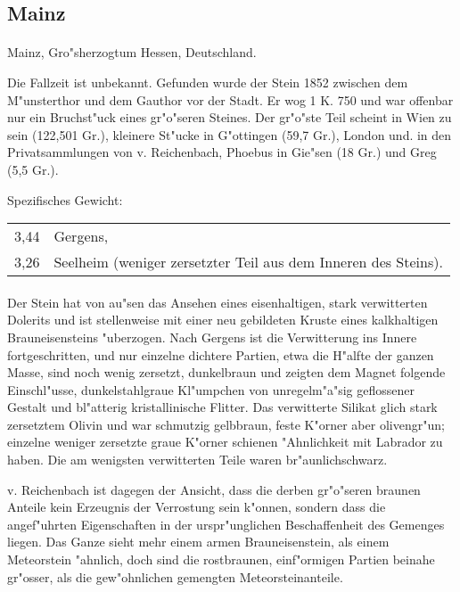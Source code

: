 \documentclass[a4paper, 11pt, oneside]{article}
\begin{document}
\subsection{Mainz}
\normalsize
\paragraph{}
Mainz, Gro"sherzogtum Hessen, Deutschland.

Die Fallzeit ist unbekannt. Gefunden wurde der Stein 1852 zwischen dem M"unsterthor und dem Gauthor vor der Stadt. Er wog 1 K. 750 und war offenbar nur ein Bruchst"uck eines gr"o"seren Steines. Der gr"o"ste Teil scheint in Wien zu sein (122,501 Gr.), kleinere St"ucke in G"ottingen (59,7 Gr.), London und. in den Privatsammlungen von v. Reichenbach, Phoebus in Gie"sen (18 Gr.) und Greg (5,5 Gr.).

Spezifisches Gewicht:  
\begin{table}[!ht]
    \centering
    \begin{tabular}{l p{60mm}}
        3,44 & Gergens,\\
        3,26 & Seelheim (weniger zersetzter Teil aus dem Inneren des Steins).
    \end{tabular}
\end{table}
\paragraph{}
Der Stein hat von au"sen das Ansehen eines eisenhaltigen, stark verwitterten Dolerits und ist stellenweise mit einer neu gebildeten Kruste eines kalkhaltigen Brauneisensteins "uberzogen. Nach Gergens ist die Verwitterung ins Innere fortgeschritten, und nur einzelne dichtere Partien, etwa die H"alfte der ganzen Masse, sind noch wenig zersetzt, dunkelbraun und zeigten dem Magnet folgende Einschl"usse, dunkelstahlgraue Kl"umpchen von unregelm"a"sig geflossener Gestalt und bl"atterig kristallinische Flitter. Das verwitterte Silikat glich stark zersetztem Olivin und war schmutzig gelbbraun, feste K"orner aber olivengr"un; einzelne weniger zersetzte graue K"orner schienen "Ahnlichkeit mit Labrador zu haben. Die am wenigsten verwitterten Teile waren br"aunlichschwarz.

v. Reichenbach ist dagegen der Ansicht, dass die derben gr"o"seren braunen Anteile kein Erzeugnis der Verrostung sein k"onnen, sondern dass die angef"uhrten Eigenschaften in der urspr"unglichen Beschaffenheit des Gemenges liegen. Das Ganze sieht mehr einem armen Brauneisenstein, als einem Meteorstein "ahnlich, doch sind die rostbraunen, einf"ormigen Partien beinahe gr"osser, als die gew"ohnlichen gemengten Meteorsteinanteile.
\end{document}
